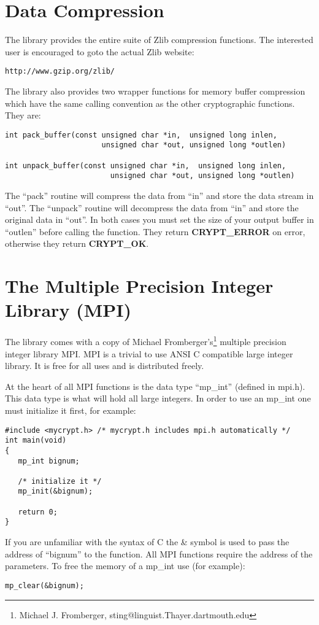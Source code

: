 \documentclass{book}
\begin{document}
\section{Data Compression}
The library provides the entire suite of Zlib compression functions.  The interested user is encouraged to goto the actual
Zlib website:
\begin{verbatim}
http://www.gzip.org/zlib/
\end{verbatim}
The library also provides two wrapper functions for memory buffer compression which have the same calling convention
as the other cryptographic functions.  They are:
\begin{verbatim}
int pack_buffer(const unsigned char *in,  unsigned long inlen,
                      unsigned char *out, unsigned long *outlen)

int unpack_buffer(const unsigned char *in,  unsigned long inlen,
                        unsigned char *out, unsigned long *outlen)
\end{verbatim}
The ``pack'' routine will compress the data from ``in'' and store the data stream in ``out''.  The ``unpack'' routine
will decompress the data from ``in'' and store the original data in ``out''.  In both cases you must set the size of your
output buffer in ``outlen'' before calling the function.  They return {\bf CRYPT\_ERROR} on error, otherwise they return
{\bf CRYPT\_OK}.

\section{The Multiple Precision Integer Library (MPI)}
The library comes with a copy of Michael Fromberger's\footnote{Michael J. Fromberger, sting@linguist.Thayer.dartmouth.edu} multiple
precision integer library MPI.  MPI is a trivial to use ANSI C compatible large integer library.  It is free for all uses and
is distributed freely.

At the heart of all MPI functions is the data type ``mp\_int'' (defined in mpi.h).  This data type is what will hold all large
integers.  In order to use an mp\_int one must initialize it first, for example:
\begin{verbatim}
#include <mycrypt.h> /* mycrypt.h includes mpi.h automatically */
int main(void)
{ 
   mp_int bignum;
   
   /* initialize it */
   mp_init(&bignum);

   return 0;
}
\end{verbatim}
If you are unfamiliar with the syntax of C the \& symbol is used to pass the address of ``bignum'' to the function.  All
MPI functions require the address of the parameters.  To free the memory of a mp\_int use (for example):
\begin{verbatim}
mp_clear(&bignum);
\end{verbatim}
\end{document}
